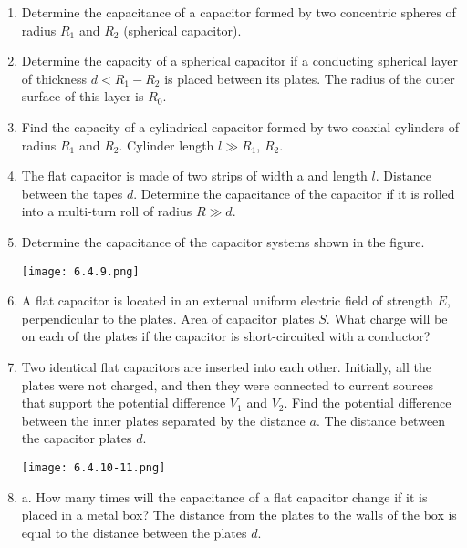 \documentclass{article}
\begin{document}
\begin{enumerate}[label=6.4.\arabic*]
\item Determine the capacitance of a capacitor formed by two concentric spheres of radius $R_1$ and $R_2$ (spherical capacitor).

\item Determine the capacity of a spherical capacitor if a conducting spherical layer of thickness $d < R_1-R_2$ is placed between its plates. The radius of the outer surface of this layer is $R_0$.

\item Find the capacity of a cylindrical capacitor formed by two coaxial cylinders of radius $R_1$ and $R_2$. Cylinder length $l \gg R_1$, $R_2$.

\item The flat capacitor is made of two strips of width a and length $l$. Distance between the tapes $d$. Determine the capacitance of the capacitor if it is rolled into a multi-turn roll of radius $R \gg d$.

\item Determine the capacitance of the capacitor systems shown in the figure.

\begin{center}
    \texttt{[image: 6.4.9.png]}
\end{center}

\item A flat capacitor is located in an external uniform electric field of strength $E$, perpendicular to the plates. Area of capacitor plates $S$. What charge will be on each of the plates if the capacitor is short-circuited with a conductor? 

\item Two identical flat capacitors are inserted into each other. Initially, all the plates were not charged, and then they were connected to current sources that support the potential difference $V_1$ and $V_2$. Find the potential difference between the inner plates separated by the distance $a$. The distance between the capacitor plates $d$.

\begin{center}
    \texttt{[image: 6.4.10-11.png]}
\end{center}

\item a. How many times will the capacitance of a flat capacitor change if it is placed in a metal box? The distance from the plates to the walls of the box is equal to the distance between the plates $d$. 


\end{enumerate}
\end{document}
